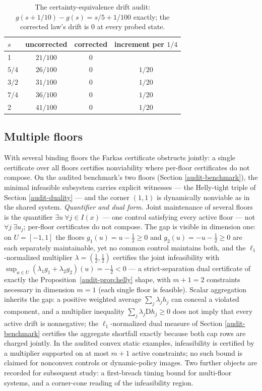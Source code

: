 \documentclass[10pt,twocolumn]{article}
\theoremstyle{plain}
\theoremstyle{definition}
\theoremstyle{remark}
\begin{document}
\begin{table}[t]
\centering
\footnotesize
\caption{The certainty-equivalence drift audit:
\(g(s + 1/10) - g(s) = s/5 + 1/100\) exactly; the corrected law's
drift is \(0\) at every probed state.}
\label{audit-tab:drift}
\begin{tabular}{@{}l c c c@{}}
\toprule
\(s\) & uncorrected & corrected & increment per \(1/4\)\\
\midrule
1 & $21/100$ & 0 & \\
$5/4$ & $26/100$ & 0 & $1/20$\\
$3/2$ & $31/100$ & 0 & $1/20$\\
$7/4$ & $36/100$ & 0 & $1/20$\\
2 & $41/100$ & 0 & $1/20$\\
\bottomrule
\end{tabular}
\end{table}

\subsection{Multiple floors}\label{audit-floors}

With several binding floors the Farkas certificate obstructs jointly: a
single certificate over all floors certifies nonviability where
per-floor certificates do not compose. On the audited benchmark's two
floors (Section \ref{audit-benchmark}), the minimal infeasible subsystem
carries explicit witnesses --- the Helly-tight triple of Section
\ref{audit-duality} --- and the corner \((1,1)\) is dynamically nonviable
as in the shared system. \emph{Quantifier and dual form.} Joint maintenance of several floors is the quantifier \(\exists u\ \forall j \in I(x)\) --- one control satisfying every active floor --- not \(\forall j\ \exists u_j\); per-floor certificates do not compose. The gap is visible in dimension one: on \(U = [-1, 1]\) the floors \(g_1(u) = u - \tfrac12 \ge 0\) and \(g_2(u) = -u - \tfrac12 \ge 0\) are each separately maintainable, yet no common control maintains both, and the \(\ell_1\)-normalized multiplier \(\lambda = (\tfrac12, \tfrac12)\) certifies the joint infeasibility with \(\sup_{u \in U}(\lambda_1 g_1 + \lambda_2 g_2)(u) = -\tfrac12 < 0\) --- a strict-separation dual certificate of exactly the Proposition~\ref{audit-prop:helly} shape, with \(m + 1 = 2\) constraints necessary in dimension \(m = 1\) (each single floor is feasible). Scalar aggregation inherits the gap: a positive weighted average \(\sum_j \lambda_j h_j\) can conceal a violated component, and a multiplier inequality \(\sum_j \lambda_j \mathrm{D}h_j \ge 0\) does not imply that every active drift is nonnegative; the \(\ell_1\)-normalized dual measure of Section \ref{audit-benchmark} certifies the aggregate shortfall exactly because both cap rows are charged jointly. In the audited convex static examples, infeasibility is certified by a multiplier supported on at most \(m + 1\) active constraints; no such bound is claimed for nonconvex controls or dynamic-policy images. Two further objects are recorded for subsequent study: a
first-breach timing bound for multi-floor systems, and a corner-cone
reading of the infeasibility region.
\end{document}
